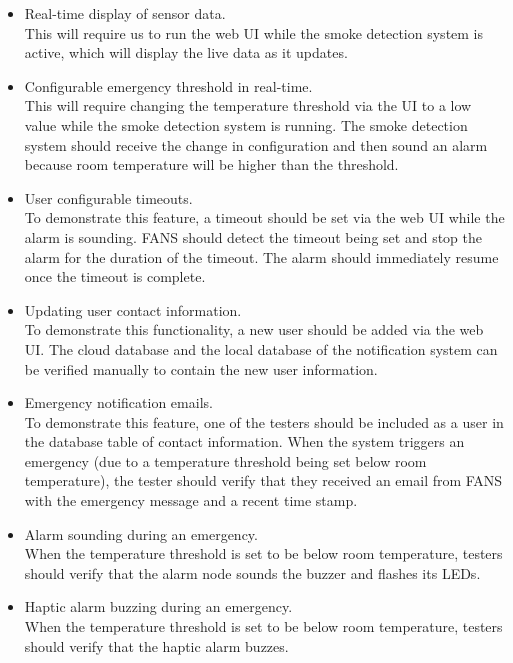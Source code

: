 \begin{itemize}
    \item Real-time display of sensor data. \\

          This will require us to run the web UI while the smoke detection system is active, which will display the live data as
          it updates.

    \item Configurable emergency threshold in real-time. \\

          This will require changing the temperature threshold via the UI to a low value while the smoke detection system is
          running. The smoke detection system should receive the change in configuration and then sound an alarm because room
          temperature will be higher than the threshold.

    \item User configurable timeouts. \\

          To demonstrate this feature, a timeout should be set via the web UI while the alarm is sounding. FANS should detect the
          timeout being set and stop the alarm for the duration of the timeout. The alarm should immediately resume once the
          timeout is complete.

    \item Updating user contact information. \\

          To demonstrate this functionality, a new user should be added via the web UI. The cloud database and the local database
          of the notification system can be verified manually to contain the new user information.

    \item Emergency notification emails. \\

          To demonstrate this feature, one of the testers should be included as a user in the database table of contact
          information. When the system triggers an emergency (due to a temperature threshold being set below room temperature),
          the tester should verify that they received an email from FANS with the emergency message and a recent time stamp.

    \item Alarm sounding during an emergency. \\

          When the temperature threshold is set to be below room temperature, testers should verify that the alarm node sounds
          the buzzer and flashes its LEDs.

    \item Haptic alarm buzzing during an emergency. \\

          When the temperature threshold is set to be below room temperature, testers should verify that the haptic alarm buzzes.

\end{itemize}
